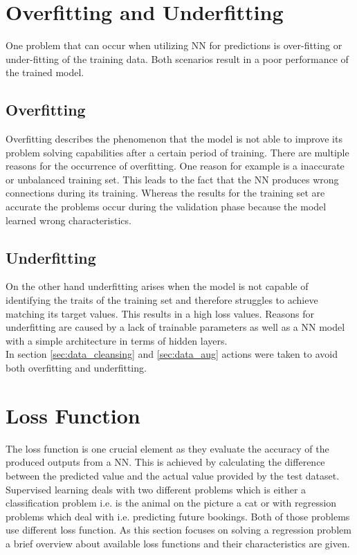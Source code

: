 \section{Overfitting and Underfitting}
One problem that can occur when utilizing NN for predictions is over-fitting or under-fitting of the training data. Both scenarios result in a poor performance of the trained model.
\subsection{Overfitting}

Overfitting describes the phenomenon that the model is not able to improve its problem solving capabilities after a certain period of training. There are multiple reasons for the occurrence of overfitting. One reason for example is a inaccurate or unbalanced training set. This leads to the fact that the NN produces wrong connections during its training.  Whereas the results for the training set are accurate the problems  occur during the validation phase because the model learned wrong characteristics. \cite{fitting} 
\subsection{Underfitting}
On the other hand underfitting arises when the model is not capable of identifying the traits of the training set and therefore struggles to achieve matching its target values. This results in a high loss values. Reasons for underfitting are caused by a lack of trainable parameters as well as a NN model with a simple architecture in terms of hidden layers.
\\\newline In section \ref{sec:data_cleansing} and \ref{sec:data_aug} actions were taken to avoid both overfitting and underfitting. 

\section{Loss Function}
\label{sec:loss_func}
The loss function is one crucial element as they evaluate the accuracy of the produced outputs from a NN. This is achieved by calculating the difference between the predicted value and the actual value provided by the test dataset. Supervised learning deals with two different problems which is either a classification problem i.e. is the animal on the picture a cat or with regression problems which deal with i.e. predicting future bookings. Both of those problems use different loss function.\cite{loss_func} As this section focuses on solving a regression problem a brief overview about available loss functions and their characteristics are given. 

